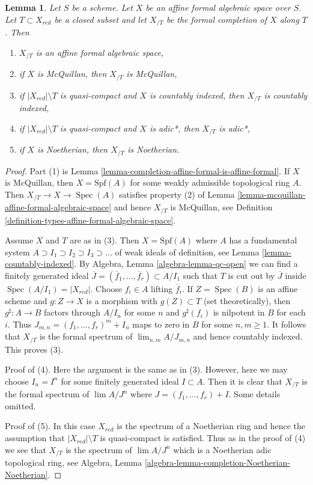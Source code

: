 \documentclass{stacks-project}
\theoremstyle{plain}
\newtheorem{lemma}[subsection]{Lemma}
\theoremstyle{definition}
\theoremstyle{remark}
\numberwithin{equation}{subsection}
\def\lim{\mathop{\mathrm{lim}}\nolimits}
\def\Spec{\mathop{\mathrm{Spec}}}
\begin{document}
\begin{lemma}
\label{lemma-recompletion-affine-types}
Let $S$ be a scheme. Let $X$ be an affine formal algebraic space over $S$.
Let $T \subset X_{red}$ be a closed subset and let $X_{/T}$
be the formal completion of $X$ along $T$. Then
\begin{enumerate}
\item $X_{/T}$ is an affine formal algebraic space,
\item if $X$ is McQuillan, then $X_{/T}$ is McQuillan,
\item if $|X_{red}| \setminus T$ is quasi-compact and $X$
is countably indexed, then $X_{/T}$ is countably indexed,
\item if $|X_{red}| \setminus T$ is quasi-compact and $X$
is adic*, then $X_{/T}$ is adic*,
\item if $X$ is Noetherian, then $X_{/T}$ is Noetherian.
\end{enumerate}
\end{lemma}

\begin{proof}
Part (1) is Lemma \ref{lemma-completion-affine-formal-is-affine-formal}.
If $X$ is McQuillan, then $X = \text{Spf}(A)$ for some weakly admissible
topological ring $A$. Then $X_{/T} \to X \to \Spec(A)$ satisfies
property (2) of Lemma \ref{lemma-mcquillan-affine-formal-algebraic-space}
and hence $X_{/T}$ is McQuillan, see
Definition \ref{definition-types-affine-formal-algebraic-space}.

\medskip\noindent
Assume $X$ and $T$ are as in (3).
Then $X = \text{Spf}(A)$ where $A$ has a fundamental system
$A \supset I_1 \supset I_2 \supset I_3 \supset \ldots$
of weak ideals of definition, see Lemma \ref{lemma-countably-indexed}.
By Algebra, Lemma \ref{algebra-lemma-qc-open}
we can find a finitely generated ideal
$\overline{J} = (\overline{f}_1, \ldots, \overline{f}_r) \subset A/I_1$
such that $T$ is cut out by $\overline{J}$ inside $\Spec(A/I_1) = |X_{red}|$.
Choose $f_i \in A$ lifting $\overline{f}_i$.
If $Z = \Spec(B)$ is an affine scheme and $g : Z \to X$ is
a morphism with $g(Z) \subset T$ (set theoretically), then
$g^\sharp : A \to B$ factors through $A/I_n$ for some $n$
and $g^\sharp(f_i)$ is nilpotent in $B$ for each $i$. Thus
$J_{m, n} = (f_1, \ldots, f_r)^m + I_n$ maps to zero in $B$
for some $n, m \geq 1$. It follows that $X_{/T}$ is the formal spectrum of
$\lim_{n, m} A/J_{m, n}$ and hence countably indexed.
This proves (3).

\medskip\noindent
Proof of (4). Here the argument is the same as in (3).
However, here we may choose $I_n = I^n$ for some finitely generated ideal
$I \subset A$. Then it is clear that $X_{/T}$ is the formal spectrum of
$\lim A/J^n$ where $J = (f_1, \ldots, f_r) + I$. Some details omitted.

\medskip\noindent
Proof of (5). In this case $X_{red}$ is the spectrum of a Noetherian ring
and hence the assumption that $|X_{red}| \setminus T$ is quasi-compact
is satisfied. Thus as in the proof of (4) we see that
$X_{/T}$ is the spectrum of $\lim A/J^n$ which is a Noetherian
adic topological ring, see
Algebra, Lemma \ref{algebra-lemma-completion-Noetherian-Noetherian}.
\end{proof}
\end{document}

